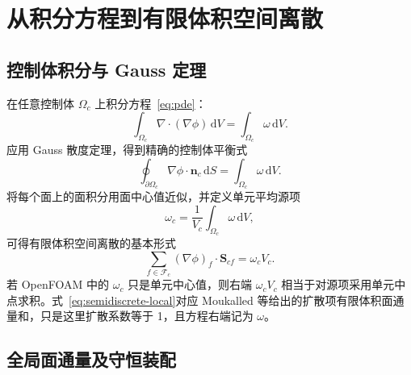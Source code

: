 \documentclass[UTF8,a4paper,11pt]{ctexart}
\newcommand{\vect}[1]{\bm{#1}}
\newcommand{\Scf}{\vect S_{cf}}
\begin{document}
\section{从积分方程到有限体积空间离散}

\subsection{控制体积分与 Gauss 定理}

在任意控制体 \(\Omega_c\) 上积分方程~\eqref{eq:pde}：
\begin{equation}
  \int_{\Omega_c}\nabla\!\cdot\!(\nabla\phi)\,\mathrm dV
  =\int_{\Omega_c}\omega\,\mathrm dV .
  \label{eq:cvint}
\end{equation}
应用 Gauss 散度定理，得到精确的控制体平衡式
\begin{equation}
  \oint_{\partial\Omega_c}\nabla\phi\cdot\vect n_c\,\mathrm dS
  =\int_{\Omega_c}\omega\,\mathrm dV .
  \label{eq:gauss}
\end{equation}
将每个面上的面积分用面中心值近似，并定义单元平均源项
\begin{equation}
  \omega_c=\frac{1}{V_c}\int_{\Omega_c}\omega\,\mathrm dV,
\end{equation}
可得有限体积空间离散的基本形式
\begin{equation}
  \boxed{
  \sum_{f\in\mathcal F_c}
  (\nabla\phi)_f\cdot\Scf
  =\omega_cV_c .}
  \label{eq:semidiscrete-local}
\end{equation}
若 OpenFOAM 中的 \(\omega_c\) 只是单元中心值，则右端 \(\omega_cV_c\) 相当于对源项采用单元中点求积。式~\eqref{eq:semidiscrete-local}对应 Moukalled 等\cite[第 8 章，式 (8.4)]{Moukalled2016}给出的扩散项有限体积面通量和，只是这里扩散系数等于 1，且方程右端记为 \(\omega\)。

\subsection{全局面通量及守恒装配}
\end{document}
